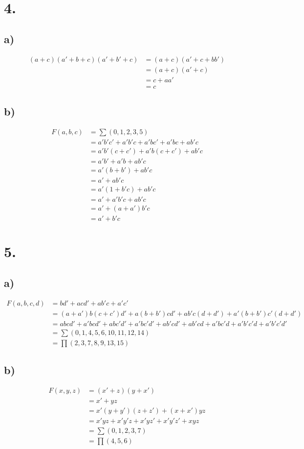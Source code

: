 \documentclass[a4paper,12pt]{article}
\begin{document}
\section*{4.}
\subsection*{a)}
\begin{align*}
	(a+c)(a'+b+c)(a'+b'+c) &= (a+c)(a'+c+bb')\\
	&= (a+c)(a'+c)\\
	&= c+aa'\\
	&= \boxed{c}
\end{align*}

\subsection*{b)}
\begin{align*}
	F(a,b,c) &= \sum (0,1,2,3,5)\\
	&= a'b'c'+a'b'c+a'bc'+a'bc+ab'c\\
	&= a'b'(c+c')+a'b(c+c')+ab'c\\
	&= a'b'+a'b+ab'c\\
	&= a'(b+b')+ab'c\\
	&= a'+ab'c\\
	&= a'(1+b'c)+ab'c\\
	&= a'+a'b'c+ab'c\\
	&= a'+(a+a')b'c\\
	&= \boxed{a'+b'c}
\end{align*}

\section*{5.}
\subsection*{a)}
\begin{align*}
	F(a,b,c,d) &= bd'+acd'+ab'c+a'c'\\
	&= (a+a')b(c+c')d'+a(b+b')cd'+ab'c(d+d')+a'(b+b')c'(d+d')\\
	&= abcd'+a'bcd'+abc'd'+a'bc'd'+ab'cd'+ab'cd+a'bc'd+a'b'c'd+a'b'c'd'\\
	&= \boxed{\sum (0,1,4,5,6,10,11,12,14)}\\
	&= \boxed{\prod (2,3,7,8,9,13,15)}
\end{align*}

\subsection*{b)}
\begin{align*}
	F(x,y,z) &= (x'+z)(y+x')\\
	&= x'+yz\\
	&= x'(y+y')(z+z') + (x+x')yz\\
	&= x'yz+x'y'z+x'yz'+x'y'z'+xyz\\
	&= \boxed{\sum (0,1,2,3,7)}\\
	&= \boxed{\prod (4,5,6)}
\end{align*}
\end{document}
